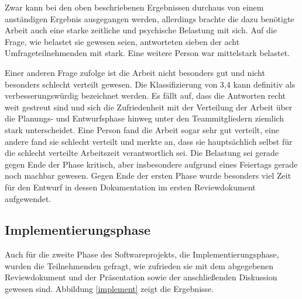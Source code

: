 \documentclass[../review_3.tex]{subfiles}
\begin{document}
Zwar kann bei den oben beschriebenen Ergebnissen durchaus von einem anständigen Ergebnis ausgegangen werden, allerdings brachte die dazu benötigte Arbeit auch eine starke zeitliche und psychische Belastung mit sich. Auf die Frage, wie belastet sie gewesen seien, antworteten sieben der acht Umfrageteilnehmenden mit stark. Eine weitere Person war mittelstark belastet.

Einer anderen Frage zufolge ist die Arbeit nicht besonders gut und nicht besonders schlecht verteilt gewesen. Die Klassifizierung von 3,4 kann definitiv als verbesserungswürdig bezeichnet werden. Es fällt auf, dass die Antworten recht weit gestreut sind und sich die Zufriedenheit mit der Verteilung der Arbeit über die Planungs- und Entwurfsphase hinweg unter den Teammitgliedern ziemlich stark unterscheidet. Eine Person fand die Arbeit sogar sehr gut verteilt, eine andere fand sie schlecht verteilt und merkte an, dass sie hauptsächlich selbst für die schlecht verteilte Arbeitszeit verantwortlich sei. Die Belastung sei gerade gegen Ende der Phase kritisch, aber insbesondere aufgrund eines Feiertags gerade noch machbar gewesen. Gegen Ende der ersten Phase wurde besonders viel Zeit für den Entwurf in dessen Dokumentation im ersten Reviewdokument aufgewendet.

\subsection{Implementierungsphase}

Auch für die zweite Phase des Softwareprojekts, die Implementierungsphase, wurden die Teilnehmenden gefragt, wie zufrieden sie mit dem abgegebenen Reviewdokument und der Präsentation sowie der anschließenden Diskussion gewesen sind. Abbildung \ref{implement} zeigt die Ergebnisse.
\end{document}
